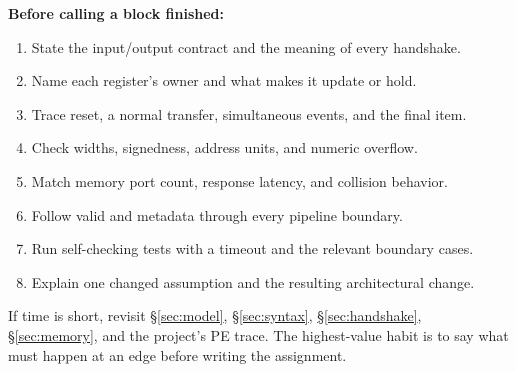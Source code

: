 \documentclass[11pt]{article}
\newcommand{\sect}[1]{\hyperref[sec:#1]{\S\ref*{sec:#1}}}
\begin{document}
\begin{samepage}
\textbf{Before calling a block finished:}
\begin{enumerate}
\item State the input/output contract and the meaning of every handshake.
\item Name each register's owner and what makes it update or hold.
\item Trace reset, a normal transfer, simultaneous events, and the final item.
\item Check widths, signedness, address units, and numeric overflow.
\item Match memory port count, response latency, and collision behavior.
\item Follow valid and metadata through every pipeline boundary.
\item Run self-checking tests with a timeout and the relevant boundary cases.
\item Explain one changed assumption and the resulting architectural change.
\end{enumerate}
\end{samepage}
If time is short, revisit \sect{model}, \sect{syntax}, \sect{handshake}, \sect{memory}, and the project's PE trace.
The highest-value habit is to say what must happen at an edge before writing the assignment.
\end{document}
